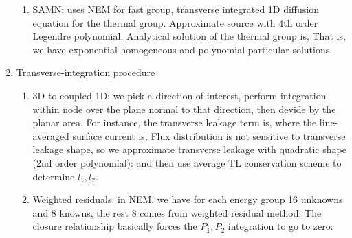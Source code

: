 \documentclass{school-22.211-notes}
\begin{document}
\begin{enumerate}
\begin{enumerate}
    \item SAMN: uses NEM for fast group, transverse integrated 1D diffusion equation for the thermal group. Approximate source with 4th order Legendre polynomial. Analytical solution of the thermal group is, 
      That is, we have exponential homogeneous and polynomial particular solutions. 
  \end{enumerate}

\item Transverse-integration procedure
  \begin{enumerate}
    \item 3D to coupled 1D: we pick a direction of interest, perform integration within node over the plane normal to that direction, then devide by the planar area. For instance, the transverse leakage term is, 
          where the line-averaged surface current is, 
          Flux distribution is not sensitive to transverse leakage shape, so we approximate transverse leakage with quadratic shape (2nd order polynomial): 
          and then use average TL conservation scheme to determine $l_1, l_2$. 
          
    \item Weighted residuals: in NEM, we have for each energy group 16 unknowns and 8 knowns, the rest 8 comes from weighted residual method: 
    The closure relationship basically forces the $P_1, P_2$ integration to go to zero: 
  \end{enumerate}



\end{enumerate}
\end{document}
